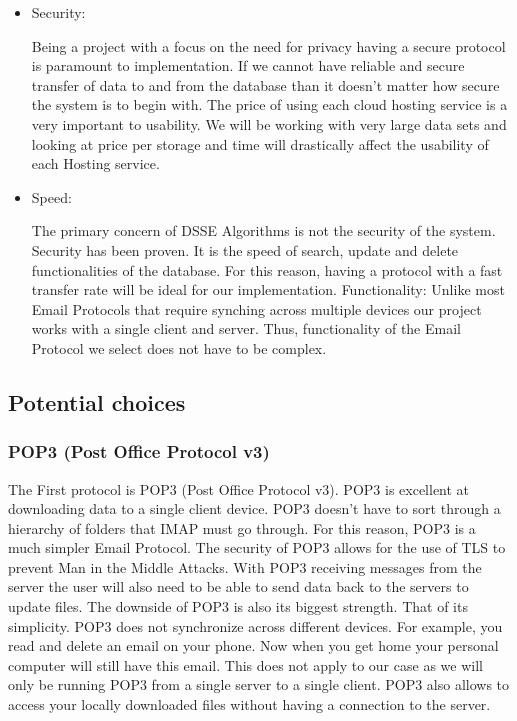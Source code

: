 \begin{itemize}
  \item Security:
  
Being a project with a focus on the need for privacy having a secure protocol is paramount to implementation. If we cannot have reliable and secure transfer of data to and from the database than it doesn’t matter how secure the system is to begin with.
The price of using each cloud hosting service is a very important to usability. We will be working with very large data sets and looking at price per storage and time will drastically affect the usability of each Hosting service.

  \item Speed:
  
The primary concern of DSSE Algorithms is not the security of the system. Security has been proven. It is the speed of search, update and delete functionalities of the database. For this reason, having a protocol with a fast transfer rate will be ideal for our implementation.
Functionality: Unlike most Email Protocols that require synching across multiple devices our project works with a single client and server. Thus, functionality of the Email Protocol we select does not have to be complex.

\end{itemize}


\subsection{ Potential choices }
\subsubsection{ POP3 (Post Office Protocol v3) }
The First protocol is POP3 (Post Office Protocol v3). POP3 is excellent at downloading data to a single client device. POP3 doesn’t have to sort through a hierarchy of folders that IMAP must go through. For this reason, POP3 is a much simpler Email Protocol. The security of POP3 allows for the use of TLS to prevent Man in the Middle Attacks. With POP3 receiving messages from the server the user will also need to be able to send data back to the servers to update files. The downside of POP3 is also its biggest strength. That of its simplicity. POP3 does not synchronize across different devices. For example, you read and delete an email on your phone. Now when you get home your personal computer will still have this email. This does not apply to our case as we will only be running POP3 from a single server to a single client. POP3 also allows to access your locally downloaded files without having a connection to the server.
